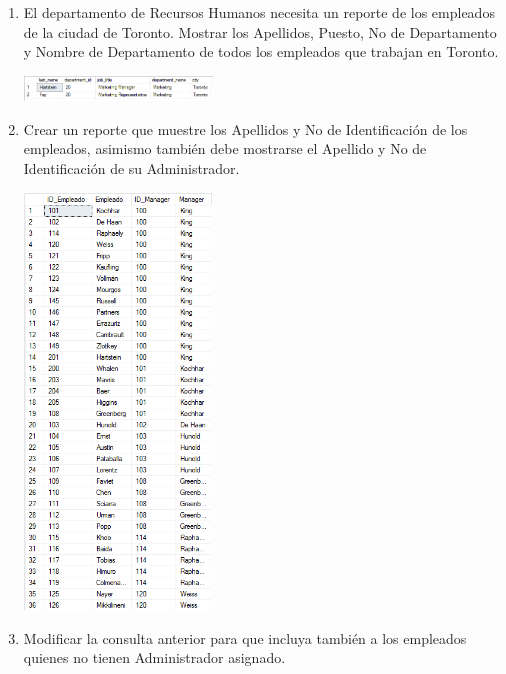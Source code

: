 \begin{enumerate}[1.]
	\item El departamento de Recursos Humanos necesita un reporte de los empleados de la ciudad de Toronto. Mostrar los Apellidos, Puesto, No de Departamento y Nombre de Departamento de todos los empleados que trabajan en Toronto.

	\begin{center}
	\includegraphics[width=5cm]{./Imagenes/actividad_08_03} 
	\end{center}

	\item Crear un reporte que muestre los Apellidos y No de Identificación de los empleados, asimismo también
debe mostrarse el Apellido y No de Identificaci\'on de su Administrador.

	\begin{center}
	\includegraphics[width=5cm]{./Imagenes/actividad_08_04} 
	\end{center}

	\item Modificar la consulta anterior para que incluya tambi\'en a los empleados quienes no tienen Administrador asignado.


\end{enumerate}
